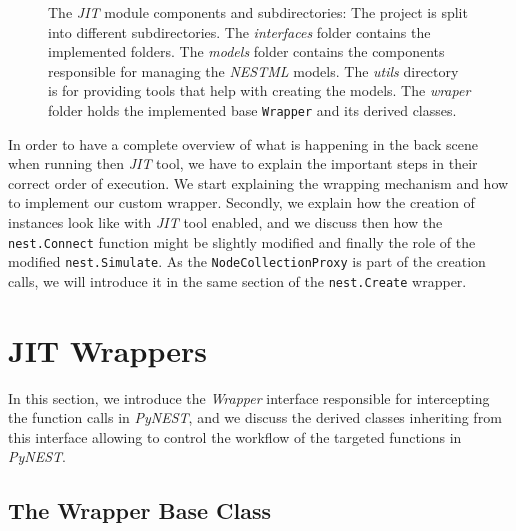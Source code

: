 \begin{figure}[ht!]
{
    }
    \caption{The \emph{JIT} module components and subdirectories: The project is split into different subdirectories. The \emph{interfaces} folder contains the implemented folders. The \emph{models} folder contains the components responsible for managing the \emph{NESTML} models. The \emph{utils} directory is for providing tools that help with creating the models. The \emph{wraper} folder holds the implemented base \texttt{Wrapper} and its derived classes. }
    \label{fig:jit_module}

\end{figure}


In order to have a complete overview of what is happening in the back scene when running then \emph{JIT} tool, we have to explain the important steps in their correct order of execution. We start explaining the wrapping mechanism and how to implement our custom wrapper. Secondly, we explain how the creation of instances look like with \emph{JIT} tool enabled, and we discuss then how the \texttt{nest.Connect} function might be slightly modified and finally the role of the modified \texttt{nest.Simulate}. As the \texttt{NodeCollectionProxy} is part of the creation calls, we will introduce it in the same section of  the \texttt{nest.Create} wrapper.





\section{JIT Wrappers}

In this section, we introduce the \emph{Wrapper} interface responsible for intercepting the function calls in \emph{PyNEST}, and we discuss the derived classes inheriting from this interface allowing to control the workflow of the targeted functions in \emph{PyNEST}.

\subsection{The Wrapper Base Class}


